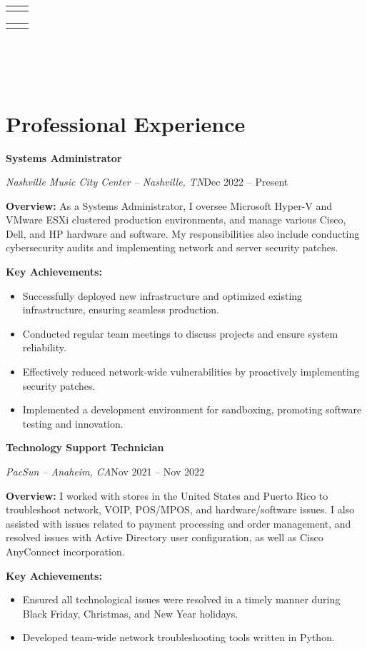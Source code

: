 \documentclass[a4paper]{article}
\makeatletter
\renewcommand{\maketitle}{
  \begin{widebox}
    {\huge\bfseries\textsf\theauthor} \\
    \medskip{}
    \begin{tabular}{@{}c|c@{}}
        \faIcon{linkedin} \textsf{\applinkedinurl{}} & \faIcon{github} \textsf{\appgithuburl{}}
    \end{tabular}
    \begin{tabular}{@{}c|c@{}}
        \faIcon{mobile} \textsf{\appcellphone{}} & \faIcon{envelope} \textsf{\appemail{}}
    \end{tabular} \\
    \medskip{}
    \faIcon{home} \textsf{\appaddresslineone{}} \\
    \textsf{\appaddresslinetwo{}} \\
    \textsf{\appaddresslinethree{}}
  \end{widebox}
}
\makeatother
\begin{document}
\author{\textsf{\appfirstname{} \applastname{}}}

\maketitle

\section{Professional Experience}
\begin{minipage}{\textwidth}
\textbf{Systems Administrator}\par
\textit{Nashville Music City Center -- Nashville, TN}\hfill Dec 2022 -- Present

\medskip
\textbf{Overview:} As a Systems Administrator, I oversee Microsoft Hyper-V and VMware ESXi clustered production environments, and manage various Cisco, Dell, and HP hardware and software. My responsibilities also include conducting cybersecurity audits and implementing network and server security patches.

\medskip
\textbf{Key Achievements:} 
\begin{itemize}
    \item Successfully deployed new infrastructure and optimized existing infrastructure, ensuring seamless production.
    \item Conducted regular team meetings to discuss projects and ensure system reliability.
    \item Effectively reduced network-wide vulnerabilities by proactively implementing security patches.
    \item Implemented a development environment for sandboxing, promoting software testing and innovation.
\end{itemize}
\end{minipage}

\vspace{1.5em}
\begin{minipage}{\textwidth}
\textbf{Technology Support Technician}\par
\textit{PacSun -- Anaheim, CA}\hfill Nov 2021 -- Nov 2022

\medskip
\textbf{Overview:} I worked with stores in the United States and Puerto Rico to troubleshoot network, VOIP, POS/MPOS, and hardware/software issues. I also assisted with issues related to payment processing and order management, and resolved issues with Active Directory user configuration, as well as Cisco AnyConnect incorporation.

\medskip
\textbf{Key Achievements:}
\begin{itemize}
    \item Ensured all technological issues were resolved in a timely manner during Black Friday, Christmas, and New Year holidays.
    \item Developed team-wide network troubleshooting tools written in Python.
\end{itemize}
\end{minipage}
\end{document}
